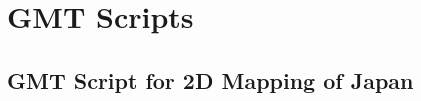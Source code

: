 \documentclass[land,article,accept,pdftex,moreauthors]{Definitions/mdpi}
\begin{document}
\appendixstart
\appendix
\section[\appendixname~\thesection]{GMT Scripts}
\label{app1}
\subsection[\appendixname~\thesubsection]{GMT Script for 2D Mapping of Japan}
\renewcommand{\thelstlisting}{A\arabic{lstlisting}}%
\end{document}
